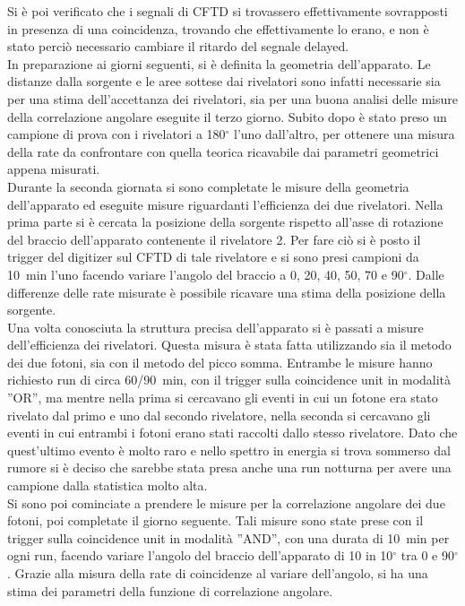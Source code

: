 Si è poi verificato che i segnali di CFTD si trovassero effettivamente sovrapposti in presenza di una coincidenza, trovando che effettivamente lo erano, e non è stato perciò necessario cambiare il ritardo del segnale delayed.\\

In preparazione ai giorni seguenti, si è definita la geometria dell'apparato. Le distanze dalla sorgente e le aree sottese dai rivelatori sono infatti necessarie sia per una stima dell'accettanza dei rivelatori, sia per una buona analisi delle misure della correlazione angolare eseguite il terzo giorno. Subito dopo è stato preso un campione di prova con i rivelatori a 180$^\circ$ l'uno dall'altro, per ottenere una misura della rate da confrontare con quella teorica ricavabile dai parametri geometrici appena misurati.\\

Durante la seconda giornata si sono completate le misure della geometria dell'apparato ed eseguite misure riguardanti l'efficienza dei due rivelatori. Nella prima parte si è cercata la posizione della sorgente rispetto all'asse di rotazione del braccio dell'apparato contenente il rivelatore 2. Per fare ciò si è posto il trigger del digitizer sul CFTD di tale rivelatore e si sono presi campioni da 10~min l'uno facendo variare l'angolo del braccio a 0, 20, 40, 50, 70 e 90$^\circ$. Dalle differenze delle rate misurate è possibile ricavare una stima della posizione della sorgente.\\

Una volta conosciuta la struttura precisa dell'apparato si è passati a misure dell'efficienza dei rivelatori. Questa misura è stata fatta utilizzando sia il metodo dei due fotoni, sia con il metodo del picco somma. Entrambe le misure hanno richiesto run di circa 60/90~min, con il trigger sulla coincidence unit in modalità ''OR'', ma mentre nella prima si cercavano gli eventi in cui un fotone era stato rivelato dal primo e uno dal secondo rivelatore, nella seconda si cercavano gli eventi in cui entrambi i fotoni erano stati raccolti dallo stesso rivelatore. Dato che quest'ultimo evento è molto raro e nello spettro in energia si trova sommerso dal rumore si è deciso che sarebbe stata presa anche una run notturna per avere una campione dalla statistica molto alta.\\

Si sono poi cominciate a prendere le misure per la correlazione angolare dei due fotoni, poi completate il giorno seguente. Tali misure sono state prese con il trigger sulla coincidence unit in modalità ''AND'', con una durata di 10~min per ogni run, facendo variare l'angolo del braccio dell'apparato di 10 in 10$^\circ$ tra 0 e 90$^\circ$. Grazie alla misura della rate di coincidenze al variare dell'angolo, si ha una stima dei parametri della funzione di correlazione angolare.\\
